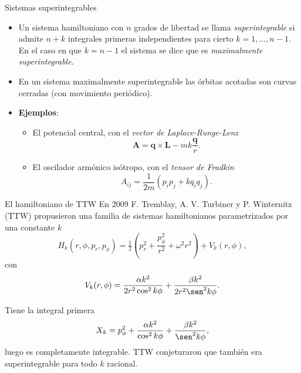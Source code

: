 \documentclass[aspectratio=169,mathserif]{beamer}
\newcommand{\vect}[1]{\mathbf{#1}}
\begin{document}
  \begin{frame}{Sistemas superintegrables}
    \begin{itemize}
      \item Un sistema hamiltoniano con $n$ grados de libertad se llama \emph{superintegrable} si admite $n+k$ integrales primeras independientes para cierto $k=1,\dots,n-1$. En el caso en que $k=n-1$ el sistema se dice que es \emph{maximalmente superintegrable}.
    \pause
      \item En un sistema maximalmente superintegrable las órbitas acotadas son curvas cerradas (con movimiento periódico).
    \pause
      \item \textbf{Ejemplos}:
    \pause
	\begin{itemize}
	  \item El potencial central, con el \emph{vector de Laplace-Runge-Lenz} 
	    \begin{equation*}
	      \vect{A}=\vect{q}\times \vect{L} - mk\frac{\vect{q}}{r}.
	    \end{equation*}
    \pause
	  \item El oscilador armónico isótropo, con el \emph{tensor de Fradkin}
	    \begin{equation*}
	      A_{ij}=\frac{1}{2m}(p_ip_j+kq_iq_j).
	    \end{equation*}
	\end{itemize}
    \end{itemize}
    
  \end{frame}

  \begin{frame}{El hamiltoniano de TTW}
    En 2009 F. Tremblay, A. V. Turbiner y P. Winternitz (TTW) propusieron una familia de sistemas hamiltonianos parametrizados por una constante $k$
    \begin{equation*}
      H_k(r,\phi, p_r, p_\phi)=\tfrac{1}{2}\left( p_r^2+\frac{p_\phi^2}{r^2}+\omega^2 r^2 \right) + V_k(r,\phi),
    \end{equation*}
    con
    \begin{equation*}
      V_k(r,\phi)=\frac{\alpha k^2}{2r^2 \cos^2 k\phi}+ \frac{\beta k^2}{2r^2\sen^2 k\phi}.
    \end{equation*}
    \pause

    Tiene la integral primera
    \begin{equation*}
      X_k=p_\phi^2 + \frac{\alpha k^2}{\cos^2 k\phi}+ \frac{\beta k^2}{\sen^2 k\phi},
    \end{equation*}
    luego es completamente integrable. TTW conjeturaron que también era superintegrable para todo $k$ racional.
  \end{frame}
\end{document}
